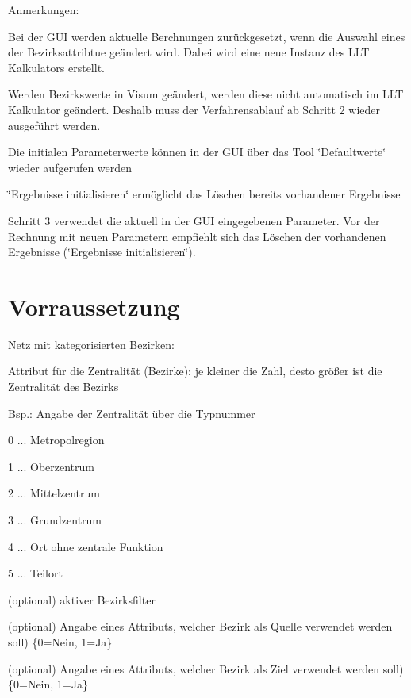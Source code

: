 Anmerkungen:


\begin{DoxyItemize}
\item Bei der GUI werden aktuelle Berchnungen zurückgesetzt, wenn die Auswahl eines der Bezirksattribtue geändert wird. Dabei wird eine neue Instanz des LLT Kalkulators erstellt.
\item Werden Bezirkswerte in Visum geändert, werden diese nicht automatisch im LLT Kalkulator geändert. Deshalb muss der Verfahrensablauf ab Schritt 2 wieder ausgeführt werden.
\item Die initialen Parameterwerte können in der GUI über das Tool \char`\"{}Defaultwerte\char`\"{} wieder aufgerufen werden
\item \char`\"{}Ergebnisse initialisieren\char`\"{} ermöglicht das Löschen bereits vorhandener Ergebnisse
\item Schritt 3 verwendet die aktuell in der GUI eingegebenen Parameter. Vor der Rechnung mit neuen Parametern empfiehlt sich das Löschen der vorhandenen Ergebnisse (\char`\"{}Ergebnisse initialisieren\char`\"{}).
\end{DoxyItemize}\hypertarget{md__c_1__users_ac128405__desktop__software__luftlinientool__luftlinientool2022__r_e_a_d_m_e_autotoc_md5}{}
\section{Vorraussetzung}
Netz mit kategorisierten Bezirken:
\begin{DoxyItemize}
\item Attribut für die Zentralität (Bezirke): je kleiner die Zahl, desto größer ist die Zentralität des Bezirks

Bsp.: Angabe der Zentralität über die Typnummer
\begin{DoxyItemize}
\item 0 ... Metropolregion
\item 1 ... Oberzentrum
\item 2 ... Mittelzentrum
\item 3 ... Grundzentrum
\item 4 ... Ort ohne zentrale Funktion
\item 5 ... Teilort
\end{DoxyItemize}
\item (optional) aktiver Bezirksfilter
\item (optional) Angabe eines Attributs, welcher Bezirk als Quelle verwendet werden soll) \{0=Nein, 1=Ja\}
\item (optional) Angabe eines Attributs, welcher Bezirk als Ziel verwendet werden soll) \{0=Nein, 1=Ja\} 
\end{DoxyItemize}